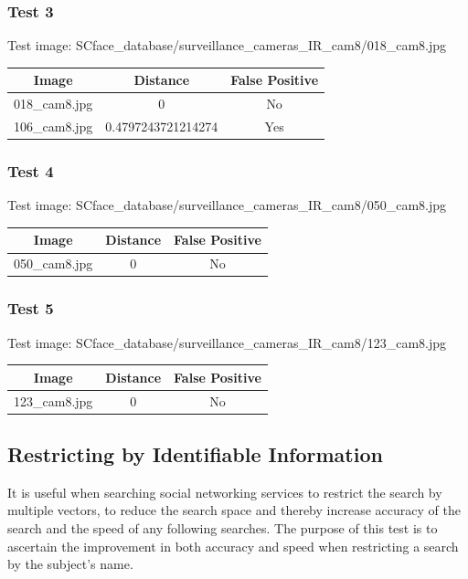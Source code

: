 \documentclass[12pt]{article}
\begin{document}
\subsubsection{Test 3}
Test image: SCface\_database/surveillance\_cameras\_IR\_cam8/018\_cam8.jpg

\begin{center}
\begin{tabular}{ccc}
Image & Distance & False Positive \\
\hline
018\_cam8.jpg & 0 & No \\
106\_cam8.jpg & 0.4797243721214274 & Yes \\
\end{tabular}
\end{center}

\subsubsection{Test 4}
Test image: SCface\_database/surveillance\_cameras\_IR\_cam8/050\_cam8.jpg

\begin{center}
\begin{tabular}{ccc}
Image & Distance & False Positive \\
\hline
050\_cam8.jpg & 0 & No \\
\end{tabular}
\end{center}

\subsubsection{Test 5}
Test image: SCface\_database/surveillance\_cameras\_IR\_cam8/123\_cam8.jpg

\begin{center}
\begin{tabular}{ccc}
Image & Distance & False Positive \\
\hline
123\_cam8.jpg & 0 & No \\
\end{tabular}
\end{center}


\subsection{Restricting by Identifiable Information}
It is useful when searching social networking services to restrict the search by multiple vectors, to reduce the search space and thereby increase accuracy of the search and the speed of any following searches. The purpose of this test is to ascertain the improvement in both accuracy and speed when restricting a search by the subject's name.
\end{document}
